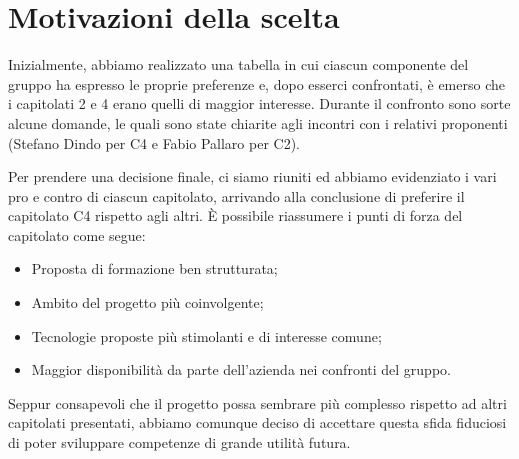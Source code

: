 \section{Motivazioni della scelta}
Inizialmente, abbiamo realizzato una tabella in cui ciascun componente del gruppo ha espresso le proprie preferenze e, dopo esserci confrontati, è emerso che i capitolati 2 e 4 erano quelli di maggior interesse. Durante il confronto sono sorte alcune domande, le quali sono state chiarite agli incontri con i relativi proponenti (Stefano Dindo per C4 e Fabio Pallaro per C2).

Per prendere una decisione finale, ci siamo riuniti ed abbiamo evidenziato i vari pro e contro di ciascun capitolato, arrivando alla conclusione di preferire il capitolato C4 rispetto agli altri. È possibile riassumere i punti di forza del capitolato come segue: 
\begin{itemize}
	\item Proposta di formazione ben strutturata;
	\item Ambito del progetto più coinvolgente;
	\item Tecnologie proposte più stimolanti e di interesse comune;
	\item Maggior disponibilità da parte dell’azienda nei confronti del gruppo.
\end{itemize}
Seppur consapevoli che il progetto possa sembrare più complesso rispetto ad altri capitolati presentati, abbiamo comunque deciso di accettare questa sfida fiduciosi di poter sviluppare competenze di grande utilità futura.



